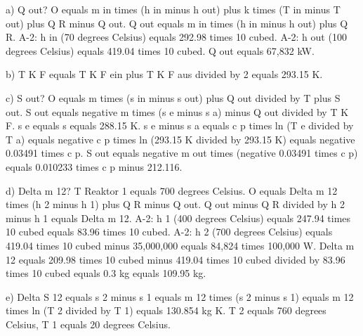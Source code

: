 a) Q out? O equals m in times (h in minus h out) plus k times (T in minus T out) plus Q R minus Q out. Q out equals m in times (h in minus h out) plus Q R. A-2: h in (70 degrees Celsius) equals 292.98 times 10 cubed. A-2: h out (100 degrees Celsius) equals 419.04 times 10 cubed. Q out equals 67,832 kW.

b) T K F equals T K F ein plus T K F aus divided by 2 equals 293.15 K.

c) S out? O equals m times (s in minus s out) plus Q out divided by T plus S out. S out equals negative m times (s e minus s a) minus Q out divided by T K F. s e equals s equals 288.15 K. s e minus s a equals c p times ln (T e divided by T a) equals negative c p times ln (293.15 K divided by 293.15 K) equals negative 0.03491 times c p. S out equals negative m out times (negative 0.03491 times c p) equals 0.010233 times c p minus 212.116.

d) Delta m 12? T Reaktor 1 equals 700 degrees Celsius. O equals Delta m 12 times (h 2 minus h 1) plus Q R minus Q out. Q out minus Q R divided by h 2 minus h 1 equals Delta m 12. A-2: h 1 (400 degrees Celsius) equals 247.94 times 10 cubed equals 83.96 times 10 cubed. A-2: h 2 (700 degrees Celsius) equals 419.04 times 10 cubed minus 35,000,000 equals 84,824 times 100,000 W. Delta m 12 equals 209.98 times 10 cubed minus 419.04 times 10 cubed divided by 83.96 times 10 cubed equals 0.3 kg equals 109.95 kg.

e) Delta S 12 equals s 2 minus s 1 equals m 12 times (s 2 minus s 1) equals m 12 times ln (T 2 divided by T 1) equals 130.854 kg K. T 2 equals 760 degrees Celsius, T 1 equals 20 degrees Celsius.